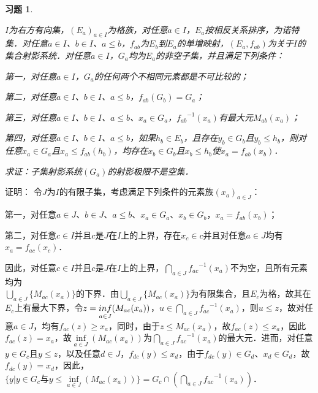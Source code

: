 \documentclass[12pt, a4paper, oneside]{book}
\newtheorem{exer}{习题}
\begin{document}
			\begin{exer}\label{exer193}
				\hfill\par
				$I$为右方有向集，$(E_a)_{a\in I}$为格族，对任意$a\in I$，$E_a$按相反关系排序，为诺特集．对任意$a\in I$、$b\in I$、$a\leq b$，$f_{ab}$为$E_b$到$E_a$的单增映射，$(E_a, f_{ab})$为关于$I$的集合射影系统．对任意$a\in I$，$G_a$均为$E_a$的非空子集，并且满足下列条件：
				\par
				第一，对任意$a\in I$，$G_a$的任何两个不相同元素都是不可比较的；
				\par
				第二，对任意$a\in I$、$b\in I$、$a\leq b$，$f_{ab}(G_b)=G_a$；
				\par
				第三，对任意$a\in I$、$b\in I$、$a\leq b$、$x_a\in G_a$，${f_{ab}}^{-1}(x_a)$有最大元$M_{ab}(x_a)$；
				\par
				第四，对任意$a\in I$、$b\in I$、$a\leq b$，如果$h_b\in E_b$，且存在$y_b\in G_b$且$y_b\leq h_b$，则对任意$x_a\in G_a$且$x_a\leq f_{ab}(h_b)$，均存在$x_b\in G_b$且$x_b\leq h_b$使$x_a=f_{ab}(x_b)$．
				\par
				求证：子集射影系统$(G_a)$的射影极限不是空集．
			\end{exer}
			证明：
			令$J$为$I$的有限子集，考虑满足下列条件的元素族$(x_a)_{a\in J}$：
			\par
			第一，对任意$a\in J$、$b\in J$、$a\leq b$、$x_a\in G_a$、$x_b\in G_b$，$x_a=f_{ab}(x_b)$；
			\par
			第二，对任意$c\in I$并且$c$是$J$在$I$上的上界，存在$x_c\in c$并且对任意$a\in J$均有$x_a=f_{ac}(x_c)$．
			\par
			因此，对任意$c\in I$并且$c$是$J$在$I$上的上界，$\bigcap\limits_{a\in J}{f_{ac}}^{-1}(x_a)$不为空，且所有元素均为\\$\bigcup\limits_{a\in J}\{M_{ac}(x_a)\}$的下界．由$\bigcup\limits_{a\in J}\{M_{ac}(x_a)\}$为有限集合，且$E_c$为格，故其在$E_c$上有最大下界，令$z\\=\mathop{inf}\limits_{a\in J}(M_{ac}(x_a))$，$u\in \bigcap\limits_{a\in J}{f_{ac}}^{-1}(x_a)$，则$u\leq z$，故对任意$a\in J$，均有$f_{ac}(z)\geq x_a$，同时，由于$z\leq M_{ac}(x_a)$，故$f_{ac}(z)\leq x_a$，因此$f_{ac}(z)=x_a$，故$\mathop{inf}\limits_{a\in J}(M_{ac}(x_a))$为$\bigcap\limits_{a\in J}{f_{ac}}^{-1}(x_a)$的最大元．进而，对任意$y\in G_c$且$y\leq z$，以及任意$d\in J$，$f_{dc}(y)\leq x_d$，由于$f_{dc}(y)\in G_d$、$x_d\in G_d$，故$f_{dc}(y)=x_d$，因此，$\{y|y\in G_c\text{与}y\leq \mathop{inf}\limits_{a\in J}(M_{ac}(x_a))\}=G_c\cap(\bigcap\limits_{a\in J}{f_{ac}}^{-1}(x_a))$．
			\par
\end{document}
